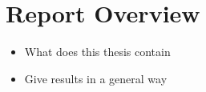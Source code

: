 \section{Report Overview}

\begin{itemize}
\item What does this thesis contain
\item Give results in a general way
\end{itemize}